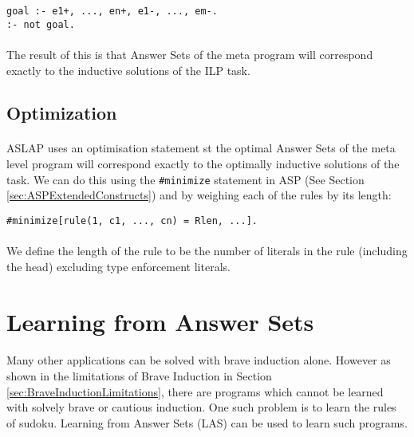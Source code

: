 \documentclass{article}
\theoremstyle{plain}
\theoremstyle{definition}
\begin{document}
\begin{multicols}{2}
\begin{lstlisting}
goal :- e1+, ..., en+, e1-, ..., em-.
:- not goal.
\end{lstlisting}

\paragraph{} The result of this is that Answer Sets of the meta program will correspond exactly to the inductive solutions of the ILP task. 

\subsection{Optimization}

\paragraph{} ASLAP uses an optimisation statement st the optimal Answer Sets of the meta level program will correspond exactly to the optimally inductive solutions of the task. We can do this using the \lstinline{#minimize} statement in ASP (See Section \ref{sec:ASPExtendedConstructs}) and by weighing each of the rules by its length:

\begin{lstlisting}
#minimize[rule(1, c1, ..., cn) = Rlen, ...].
\end{lstlisting}

\paragraph{} We define the length of the rule to be the number of literals in the rule (including the head) excluding type enforcement literals.

\section{Learning from Answer Sets}

\paragraph{} Many other applications can be solved with brave induction alone. However as shown in the limitations of Brave Induction in Section \ref{sec:BraveInductionLimitations}, there are programs which cannot be learned with solvely brave or cautious induction. One such problem is to learn the rules of sudoku. Learning from Answer Sets (LAS) can be used to learn such programs\cite{law14}.


\end{multicols}
\end{document}
